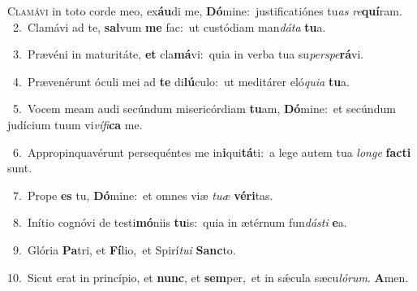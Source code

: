 \lettrine{\initial\textcolor{\initialcolor}{C}}{lamávi} in toto corde meo, ex\-\textbf{áu}\-di me, \textbf{Dó}\-mine:~\star justificatiónes tu\textit{as} \textit{re}\-\textbf{quí}ram.\\
{\numbfont\textcolor{\numbcolor}{~2.}}~Clamávi ad te, \textbf{sal}\-vum \textbf{me} fac:~\star ut custódiam man\-\textit{dá}\-\textit{ta} \textbf{tu}\-a.\par
{\numbfont\textcolor{\numbcolor}{~3.}}~Prævéni in maturitáte, \textbf{et} cla\-\textbf{má}\-vi:~\star quia in verba tua su\-\textit{per}\-\textit{spe}\textbf{rá}vi.\par
{\numbfont\textcolor{\numbcolor}{~4.}}~Prævenérunt óculi mei ad \textbf{te} di\-\textbf{lú}\-culo:~\star ut meditárer eló\-\textit{qui}\-\textit{a} \textbf{tu}\-a.\par
{\numbfont\textcolor{\numbcolor}{~5.}}~Vocem meam audi secúndum misericórdiam \textbf{tu}\-am, \textbf{Dó}\-mine:~\star et secúndum judícium tuum vi\-\textit{ví}\-\textit{fi}\textbf{ca} me.\par
{\numbfont\textcolor{\numbcolor}{~6.}}~Appropinquavérunt persequéntes me in\-\textbf{i}\-qui\-\textbf{tá}\-ti:~\star a lege autem tua \textit{lon}\-\textit{ge} \textbf{fac}\-\textbf{ti} sunt.\par
{\numbfont\textcolor{\numbcolor}{~7.}}~Prope \textbf{es} tu, \textbf{Dó}\-mine:~\star et omnes viæ \textit{tu}\-\textit{æ} \textbf{vé}\-\textbf{ri}tas.\par
{\numbfont\textcolor{\numbcolor}{~8.}}~Inítio cognóvi de testi\-\textbf{mó}\-niis \textbf{tu}\-is:~\star quia in ætérnum fun\-\textit{dás}\-\textit{ti} \textbf{e}\-a.\par
{\numbfont\textcolor{\numbcolor}{~9.}}~Glória \textbf{Pa}\-tri, et \textbf{Fí}\-lio,~\star et Spirí\-\textit{tu}\-\textit{i} \textbf{Sanc}\-to.\par
{\numbfont\textcolor{\numbcolor}{10.}}~Sicut erat in princípio, et \textbf{nunc}\-, et \textbf{sem}\-per,~\star et in sǽcula sæcu\-\textit{ló}\-\textit{rum}. \textbf{A}\-men.\par
